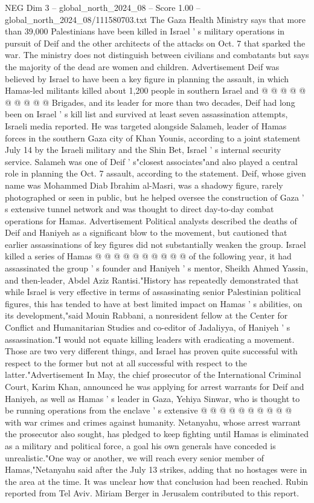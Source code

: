 \begin{textsample}{NEG Dim 3 – global\_north\_2024\_08 – Score 1.00 – global\_north\_2024\_08/111580703.txt}
The Gaza Health Ministry says that more than 39,000 Palestinians have been killed in Israel ' s military operations in pursuit of Deif and the other architects of the attacks on Oct. 7 that sparked the war.
The ministry does not distinguish between civilians and combatants but says the majority of the dead are women and children.
Advertisement Deif was believed by Israel to have been a key figure in planning the assault, in which Hamas-led militants killed about 1,200 people in southern Israel and @ @ @ @ @ @ @ @ @ @ Brigades, and its leader for more than two decades, Deif had long been on Israel ' s kill list and survived at least seven assassination attempts, Israeli media reported.
He was targeted alongside Salameh, leader of Hamas forces in the southern Gaza city of Khan Younis, according to a joint statement July 14 by the Israeli military and the Shin Bet, Israel ' s internal security service.
Salameh was one of Deif ' s"closest associates"and also played a central role in planning the Oct. 7 assault, according to the statement.
Deif, whose given name was Mohammed Diab Ibrahim al-Masri, was a shadowy figure, rarely photographed or seen in public, but he helped oversee the construction of Gaza ' s extensive tunnel network and was thought to direct day-to-day combat operations for Hamas.
Advertisement Political analysts described the deaths of Deif and Haniyeh as a significant blow to the movement, but cautioned that earlier assassinations of key figures did not substantially weaken the group.
Israel killed a series of Hamas @ @ @ @ @ @ @ @ @ @ of the following year, it had assassinated the group ' s founder and Haniyeh ' s mentor, Sheikh Ahmed Yassin, and then-leader, Abdel Aziz Rantisi."History has repeatedly demonstrated that while Israel is very effective in terms of assassinating senior Palestinian political figures, this has tended to have at best limited impact on Hamas ' s abilities, on its development,"said Mouin Rabbani, a nonresident fellow at the Center for Conflict and Humanitarian Studies and co-editor of Jadaliyya, of Haniyeh ' s assassination."I would not equate killing leaders with eradicating a movement.
Those are two very different things, and Israel has proven quite successful with respect to the former but not at all successful with respect to the latter."Advertisement In May, the chief prosecutor of the International Criminal Court, Karim Khan, announced he was applying for arrest warrants for Deif and Haniyeh, as well as Hamas ' s leader in Gaza, Yehiya Sinwar, who is thought to be running operations from the enclave ' s extensive @ @ @ @ @ @ @ @ @ @ with war crimes and crimes against humanity.
Netanyahu, whose arrest warrant the prosecutor also sought, has pledged to keep fighting until Hamas is eliminated as a military and political force, a goal his own generals have conceded is unrealistic."One way or another, we will reach every senior member of Hamas,"Netanyahu said after the July 13 strikes, adding that no hostages were in the area at the time.
It was unclear how that conclusion had been reached.
Rubin reported from Tel Aviv.
Miriam Berger in Jerusalem contributed to this report.

\end{textsample}

